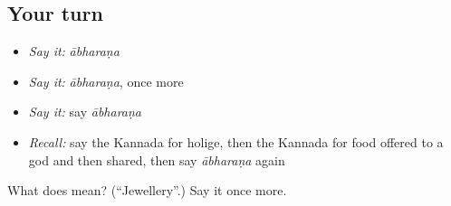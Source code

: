 \subsection*{Your turn}
\begin{itemize}
\raggedright
  \item \emph{Say it:} \emph{ābharaṇa}
  \item \emph{Say it:} \emph{ābharaṇa}, once more
  \item \emph{Say it:} say \emph{ābharaṇa}
  \item \emph{Recall:} say the Kannada for holige, then the Kannada for food offered to a god and then shared, then say \emph{ābharaṇa} again
\end{itemize}

\begin{tcolorbox}[breakable,colback=teal!4,colframe=teal!35!black,title={Before you move on}]
What does  mean? (\textquotedblleft{}Jewellery\textquotedblright{}.) Say it once more.
\end{tcolorbox}
